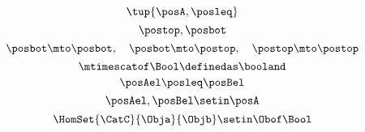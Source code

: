 {\begin{forslides}
        \begin{equation}
            \label{eq:poset_bool_a}
            \tup{\posA,{\posleq}}
        \end{equation}
        \begin{equation}
            \label{eq:poset_bool_b}
            \postop,\posbot
        \end{equation}
        \begin{equation}
            \label{eq:poset_bool_c}
            \posbot\mto \posbot, \quad \posbot\mto \postop, \quad \postop\mto \postop
        \end{equation}
        \begin{equation}
            \label{eq:poset_bool_d}
            \mtimescatof\Bool \definedas \booland
        \end{equation}
        \begin{equation}
            \label{eq:poset_bool_e}
            \posAel\posleq \posBel
        \end{equation}
        \begin{equation}
            \label{eq:poset_bool_f}
            \posAel,\posBel \setin \posA
        \end{equation}
        \begin{equation}
            \label{eq:poset_bool_g}
            \HomSet{\CatC}{\Obja}{\Objb}\setin \Obof\Bool
        \end{equation}

\end{forslides}}
